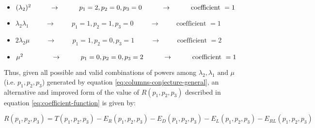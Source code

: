 \begin{itemize}
    \item \((\lambda_2)^2 \hspace{0.95cm} \rightarrow \hspace{1cm} 
    p_1 = 2, p_2=0, p_3=0 \hspace{1cm} \rightarrow \hspace{1cm} 
    \text{coefficient } = 1\)
    \item \(\lambda_2 \lambda_1 \hspace{1cm} \rightarrow \hspace{1cm} 
    p_1 = 1, p_2=1, p_3=0 \hspace{1cm} \rightarrow \hspace{1cm} 
    \text{coefficient } = 1\)
    \item \(2 \lambda_2 \mu \hspace{1cm} \rightarrow \hspace{1cm}
     p_1 = 1, p_2=0, p_3=1 \hspace{1cm} \rightarrow \hspace{1cm} 
     \text{coefficient } = 2\)
    \item \(\mu^2 \hspace{1.45cm} \rightarrow \hspace{1cm} 
    p_1=0, p_2=0, p_3=2 \hspace{1cm} \rightarrow \hspace{1cm} 
    \text{coefficient } = 1\)
\end{itemize}

Thus, given all possible and valid combinations of powers among \(\lambda_2, 
\lambda_1 \text{ and } \mu\) (i.e. \(p_1,p_2,p_3\)) generated by equation 
\ref{eq:columns-conjecture-general}, an alternative and improved form of the 
value of \(R(p_1, p_2, p_3)\) described in equation \ref{eq:coefficient-function} 
is given by:

\begin{equation} \label{eq:permutation formula}
    R(p_1, p_2, p_3) = T(p_1, p_2, p_3) - E_R(p_1, p_2, p_3) - E_D(p_1, p_2, p_3) 
    - E_L(p_1, p_2, p_3) - E_{RL}(p_1, p_2, p_3)
\end{equation}

